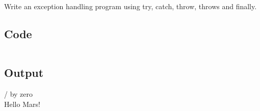 \documentclass[../main.tex]{subfiles}
\begin{document}
Write an exception handling program using try, catch, throw, throws and
finally.

\subsection{Code}
\inputminted[frame=lines, breaklines, breakanywhere, numberblanklines=false]{java}{./programs/prog10/Errors.java}

\subsection{Output}
/ by zero \\
Hello Mars! \\
\end{document}
